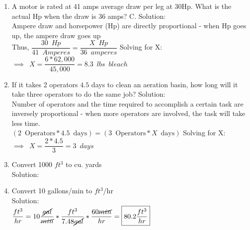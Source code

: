 \begin{enumerate}[1.]
\item A motor is rated at 41 amps average draw per leg at $30 \mathrm{Hp}$. What is the actual $\mathrm{Hp}$ when the draw is 36 amps? C. 
\vspace{0.2cm}
Solution:\\
\vspace{0.2cm}
Ampere draw and horsepower (Hp) are directly proportional - when Hp goes up, the ampere draw goes up\\
\vspace{0.2cm}
Thus, $\dfrac{30 \enspace Hp}{41 \enspace Amperes }=\dfrac{X \enspace Hp}{36 \enspace amperes}$
\vspace{0.2cm}
Solving for X:\\
\vspace{0.2cm}
$\implies \enspace X=\dfrac{6*62,000}{45,000}=\boxed{8.3 \enspace lbs \enspace bleach}$
\vspace{0.2cm}
\item If it takes 2 operators $4.5$ days to clean an aeration basin, how long will it take three operators to do the same job?
\vspace{0.2cm}
Solution:\\
\vspace{0.2cm}
Number of operators and the time required to accomplish a certain task are inversely proportional - when more operators are involved, the task will take less time.\\
\vspace{0.2cm}
$(2 \enspace \mathrm{Operators} * 4.5 \enspace \mathrm{days})=(3 \enspace \mathrm{Operators} * X \enspace \mathrm{days})$
\vspace{0.2cm}
Solving for X:\\
\vspace{0.2cm}
$\implies \enspace X=\dfrac{2*4.5}{3}=\boxed{3 \enspace days}$
\vspace{0.2cm}
\item Convert 1000 $ft^3$ to cu. yards\\
Solution:\\
\vspace{0.2cm}




\vspace{0.2cm}
\item Convert 10 gallons/min to $ft^3$/hr\\
Solution:\\
\vspace{0.2cm}
$\dfrac{ft^3}{hr}=10\dfrac{\cancel{gal}}{\cancel{min}}*\dfrac{ft^3}{7.48\cancel{gal}}*\dfrac{60\cancel{min}}{hr}=\boxed{80.2 \dfrac{ft^3}{hr}}$


\end{enumerate}
